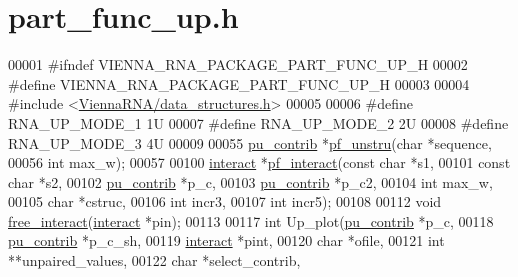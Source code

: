 \hypertarget{part__func__up_8h_source}{}\section{part\+\_\+func\+\_\+up.\+h}
\label{part__func__up_8h_source}

\begin{DoxyCode}
00001 \textcolor{preprocessor}{#ifndef VIENNA\_RNA\_PACKAGE\_PART\_FUNC\_UP\_H}
00002 \textcolor{preprocessor}{#define VIENNA\_RNA\_PACKAGE\_PART\_FUNC\_UP\_H}
00003 
00004 \textcolor{preprocessor}{#include <\hyperlink{data__structures_8h}{ViennaRNA/data\_structures.h}>}
00005 
00006 \textcolor{preprocessor}{#define   RNA\_UP\_MODE\_1   1U}
00007 \textcolor{preprocessor}{#define   RNA\_UP\_MODE\_2   2U}
00008 \textcolor{preprocessor}{#define   RNA\_UP\_MODE\_3   4U}
00009 
00055 \hyperlink{group__data__structures_structpu__contrib}{pu\_contrib} *\hyperlink{group__up__cofold_ga5b4ee40e190d2f633cd01cf0d2fe93cf}{pf\_unstru}(\textcolor{keywordtype}{char} *sequence,
00056                       \textcolor{keywordtype}{int} max\_w);
00057 
00100 \hyperlink{group__data__structures_structinteract}{interact} *\hyperlink{group__up__cofold_ga1aa0aa02bc3a724f87360c03097afd00}{pf\_interact}(\textcolor{keyword}{const} \textcolor{keywordtype}{char} *s1,
00101                       \textcolor{keyword}{const} \textcolor{keywordtype}{char} *s2,
00102                       \hyperlink{group__data__structures_structpu__contrib}{pu\_contrib} *p\_c,
00103                       \hyperlink{group__data__structures_structpu__contrib}{pu\_contrib} *p\_c2,
00104                       \textcolor{keywordtype}{int} max\_w,
00105                       \textcolor{keywordtype}{char} *cstruc,
00106                       \textcolor{keywordtype}{int} incr3,
00107                       \textcolor{keywordtype}{int} incr5);
00108 
00112 \textcolor{keywordtype}{void} \hyperlink{group__up__cofold_gadde308fd5f696dc271b1532aa96fd12f}{free\_interact}(\hyperlink{group__data__structures_structinteract}{interact} *pin);
00113 
00117 \textcolor{keywordtype}{int} Up\_plot(\hyperlink{group__data__structures_structpu__contrib}{pu\_contrib} *p\_c,
00118             \hyperlink{group__data__structures_structpu__contrib}{pu\_contrib} *p\_c\_sh,
00119             \hyperlink{group__data__structures_structinteract}{interact} *pint,
00120             \textcolor{keywordtype}{char} *ofile,
00121             \textcolor{keywordtype}{int} **unpaired\_values,
00122             \textcolor{keywordtype}{char} *select\_contrib,

\end{DoxyCode}
